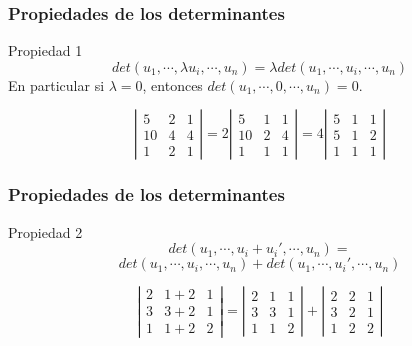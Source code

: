 \documentclass[aspectratio=169]{beamer}
\begin{document}
  
             \begin{frame}
  \frametitle{Propiedades de los determinantes}
   \begin{block}{Propiedad 1}
   \[det(u_1, \cdots,\lambda u_i, \cdots , u_n) = \lambda det(u_1,\cdots, u_i, \cdots, u_n) \]
   En particular si $\lambda=0$, entonces $det(u_1,\cdots,0,\cdots,u_n) = 0$.
\end{block}

\[ \left|\begin{array}{ccc}5 & 2 & 1 \\10 & 4 & 4 \\1 & 2 & 1\end{array}\right|
=  2\left|\begin{array}{ccc}5 & 1 & 1 \\10 & 2 & 4 \\1 & 1 & 1\end{array}\right|
=  4\left|\begin{array}{ccc}5 & 1 & 1 \\5 & 1 & 2 \\1 & 1 & 1\end{array}\right|
\]
  \end{frame} 
  
  
  
             \begin{frame}
  \frametitle{Propiedades de los determinantes}
   \begin{block}{Propiedad 2}
   \[det(u_1, \cdots,u_i+u_i', \cdots , u_n) =\] \[ det(u_1,\cdots, u_i, \cdots, u_n) + det(u_1,\cdots, u_i', \cdots, u_n) \]
\end{block}

\[ \left|\begin{array}{ccc}2 & 1+2 & 1 \\3 & 3+2 & 1 \\1 & 1+2 & 2\end{array}\right|
= \left|\begin{array}{ccc}2 & 1 & 1 \\3 & 3 & 1 \\1 & 1 & 2\end{array}\right|
+ \left|\begin{array}{ccc}2 & 2 & 1 \\3 & 2 & 1 \\1 & 2 & 2\end{array}\right|
\]
  \end{frame} 
  
\end{document}
